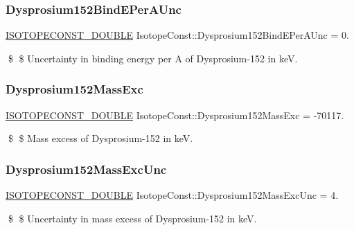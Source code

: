 \subsubsection{\texorpdfstring{Dysprosium152\+Bind\+E\+Per\+A\+Unc}{Dysprosium152BindEPerAUnc}}
{\footnotesize\ttfamily \mbox{\hyperlink{group___isotope_const-_macros_ga8f45a7272ce02c0b4c65c44636ed719a}{I\+S\+O\+T\+O\+P\+E\+C\+O\+N\+S\+T\+\_\+\+D\+O\+U\+B\+LE}} Isotope\+Const\+::\+Dysprosium152\+Bind\+E\+Per\+A\+Unc = 0.}

\$ \$ Uncertainty in binding energy per A of Dysprosium-\/152 in keV. \mbox{\label{group___isotope_const-_dysprosium-_dy152_gaeeb452b8aa66a3365fb9bd7bea06f0d3}} 
\subsubsection{\texorpdfstring{Dysprosium152\+Mass\+Exc}{Dysprosium152MassExc}}
{\footnotesize\ttfamily \mbox{\hyperlink{group___isotope_const-_macros_ga8f45a7272ce02c0b4c65c44636ed719a}{I\+S\+O\+T\+O\+P\+E\+C\+O\+N\+S\+T\+\_\+\+D\+O\+U\+B\+LE}} Isotope\+Const\+::\+Dysprosium152\+Mass\+Exc = -\/70117.}

\$ \$ Mass excess of Dysprosium-\/152 in keV. \mbox{\label{group___isotope_const-_dysprosium-_dy152_gad7e596469e012805a3c81e3d5e958da5}} 
\subsubsection{\texorpdfstring{Dysprosium152\+Mass\+Exc\+Unc}{Dysprosium152MassExcUnc}}
{\footnotesize\ttfamily \mbox{\hyperlink{group___isotope_const-_macros_ga8f45a7272ce02c0b4c65c44636ed719a}{I\+S\+O\+T\+O\+P\+E\+C\+O\+N\+S\+T\+\_\+\+D\+O\+U\+B\+LE}} Isotope\+Const\+::\+Dysprosium152\+Mass\+Exc\+Unc = 4.}

\$ \$ Uncertainty in mass excess of Dysprosium-\/152 in keV. \mbox{\label{group___isotope_const-_dysprosium-_dy152_gada020c51c126c7753471b80674bd50eb}} 
